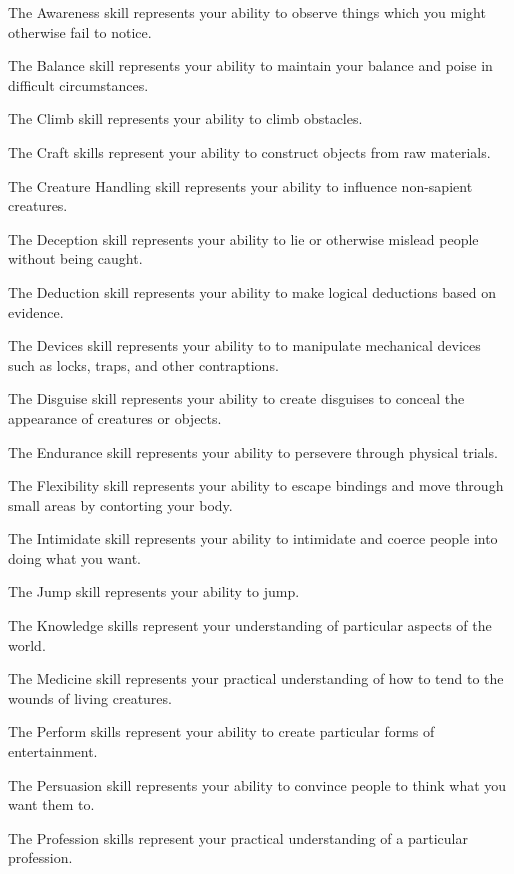    \begin{raggeditemize}
        \item The Awareness skill represents your ability to observe things which you might otherwise fail to notice.
        \item The Balance skill represents your ability to maintain your balance and poise in difficult circumstances.
        \item The Climb skill represents your ability to climb obstacles.
        \item The Craft skills represent your ability to construct objects from raw materials.
        \item The Creature Handling skill represents your ability to influence non-sapient creatures.
        \item The Deception skill represents your ability to lie or otherwise mislead people without being caught.
        \item The Deduction skill represents your ability to make logical deductions based on evidence.
        \item The Devices skill represents your ability to to manipulate mechanical devices such as locks, traps, and other contraptions.
        \item The Disguise skill represents your ability to create disguises to conceal the appearance of creatures or objects.
        \item The Endurance skill represents your ability to persevere through physical trials.
        \item The Flexibility skill represents your ability to escape bindings and move through small areas by contorting your body.
        \item The Intimidate skill represents your ability to intimidate and coerce people into doing what you want.
        \item The Jump skill represents your ability to jump.
        \item The Knowledge skills represent your understanding of particular aspects of the world.
        \item The Medicine skill represents your practical understanding of how to tend to the wounds of living creatures.
        \item The Perform skills represent your ability to create particular forms of entertainment.
        \item The Persuasion skill represents your ability to convince people to think what you want them to.
        \item The Profession skills represent your practical understanding of a particular profession.

\end{raggeditemize}
